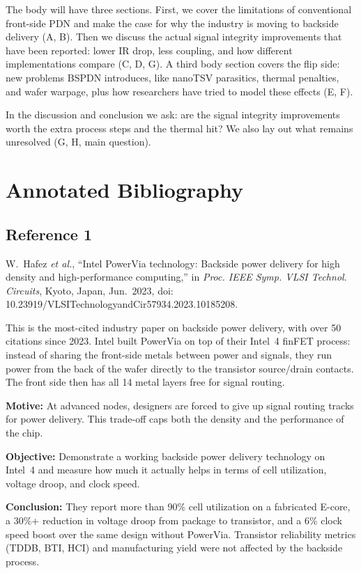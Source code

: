 \documentclass[conference,a4paper]{IEEEtran}
\begin{document}
The body will have three sections. First, we cover the limitations of conventional front-side PDN and make the case for why the industry is moving to backside delivery (A, B). Then we discuss the actual signal integrity improvements that have been reported: lower IR drop, less coupling, and how different implementations compare (C, D, G). A third body section covers the flip side: new problems BSPDN introduces, like nanoTSV parasitics, thermal penalties, and wafer warpage, plus how researchers have tried to model these effects (E, F).

In the discussion and conclusion we ask: are the signal integrity improvements worth the extra process steps and the thermal hit? We also lay out what remains unresolved (G, H, main question).

\section{Annotated Bibliography}

\subsection{Reference 1}
W.~Hafez \textit{et al.}, ``Intel PowerVia technology: Backside power delivery for high density and high-performance computing,'' in \textit{Proc. IEEE Symp. VLSI Technol. Circuits}, Kyoto, Japan, Jun.~2023, doi: 10.23919/VLSITechnologyandCir57934.2023.10185208.

This is the most-cited industry paper on backside power delivery, with over 50 citations since 2023. Intel built PowerVia on top of their Intel~4 finFET process: instead of sharing the front-side metals between power and signals, they run power from the back of the wafer directly to the transistor source/drain contacts. The front side then has all 14 metal layers free for signal routing.

\textbf{Motive:} At advanced nodes, designers are forced to give up signal routing tracks for power delivery. This trade-off caps both the density and the performance of the chip.

\textbf{Objective:} Demonstrate a working backside power delivery technology on Intel~4 and measure how much it actually helps in terms of cell utilization, voltage droop, and clock speed.

\textbf{Conclusion:} They report more than 90\% cell utilization on a fabricated E-core, a 30\%+ reduction in voltage droop from package to transistor, and a 6\% clock speed boost over the same design without PowerVia. Transistor reliability metrics (TDDB, BTI, HCI) and manufacturing yield were not affected by the backside process.
\end{document}
